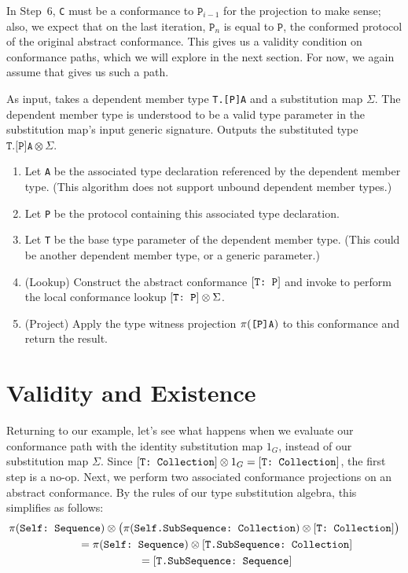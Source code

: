 \documentclass[../generics]{subfiles}
\begin{document}
In Step~6, \texttt{C} must be a conformance to $\texttt{P}_{i-1}$ for the projection to make sense; also, we expect that on the last iteration, $\texttt{P}_n$ is equal to $\texttt{P}$, the conformed protocol of the original abstract conformance. This gives us a validity condition on conformance paths, which we will explore in the next section. For now, we again assume that  gives us such a path.
\begin{algorithm}\label{dependent member type substitution}
As input, takes a dependent member type \texttt{T.[P]A} and a substitution map $\Sigma$. The dependent member type is understood to be a valid type parameter in the substitution map's input generic signature. Outputs the substituted type $\texttt{T.[P]A}\otimes\Sigma$.
\begin{enumerate}
\item Let \texttt{A} be the associated type declaration referenced by the dependent member type. (This algorithm does not support unbound dependent member types.)
\item Let \texttt{P} be the protocol containing this associated type declaration.
\item Let \texttt{T} be the base type parameter of the dependent member type. (This could be another dependent member type, or a generic parameter.)
\item (Lookup) Construct the abstract conformance $[\texttt{T:~P}]$ and invoke  to perform the local conformance lookup $[\texttt{T:~P}]\otimes\Sigma$.
\item (Project) Apply the type witness projection $\pi(\texttt{[P]A})$ to this conformance and return the result.
\end{enumerate}
\end{algorithm}

\section{Validity and Existence}\label{conformance paths exist}

Returning to our example, let's see what happens when we evaluate our conformance path with the identity substitution map $1_G$, instead of our substitution map $\Sigma$. Since $[\texttt{T:~Collection}]\otimes 1_G=[\texttt{T:~Collection}]$, the first step is a no-op. Next, we perform two associated conformance projections on an abstract conformance. By the rules of our type substitution algebra, this simplifies as follows:
\begin{gather*}
\pi(\texttt{Self:~Sequence}) \otimes \bigl(\pi(\texttt{Self.SubSequence:~Collection}) \otimes [\texttt{T:~Collection}]\bigr)\\
\qquad {} = \pi(\texttt{Self:~Sequence}) \otimes [\texttt{T.SubSequence:~Collection}]\\
\qquad {} = [\texttt{T.SubSequence:~Sequence}]
\end{gather*}
\end{document}
